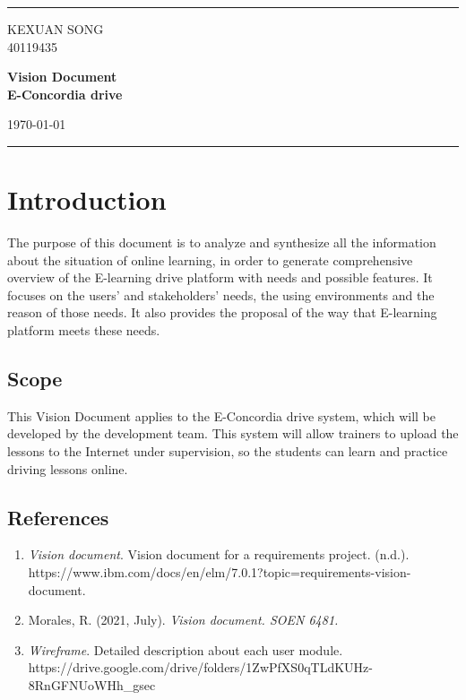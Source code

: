 \documentclass[a4paper]{article}
\begin{document}

\fancyhead[C]{}
\hrule\bigskip %
\begin{minipage}{0.295\textwidth} 
\raggedright
\normalsize
KEXUAN SONG \hfill\\   
40119435\hfill\\
\end{minipage}
\begin{minipage}{0.4\textwidth} 
\centering 
\Large
\textbf{Vision Document}\hfill\\
\textbf{E-Concordia drive}\hfill\\ 
\normalsize 
\end{minipage}
\begin{minipage}{0.295\textwidth} 
\raggedleft
\today\hfill\\
\end{minipage}
\medskip\hrule 
\bigskip


\section{Introduction}
The purpose of this document is to analyze and synthesize all the information about the situation of online learning, in order to generate comprehensive overview of the E-learning drive platform with needs and possible features.  It focuses on the users’ and stakeholders’ needs, the using environments and the reason of those needs. It also provides the proposal of the way that E-learning platform meets these needs.
\bigskip
\subsection{Scope}
This Vision Document applies to the E-Concordia drive system, which will be developed by the development team. This system will allow trainers to upload the lessons to the Internet under supervision, so the students can learn and practice driving lessons online.
\bigskip
\subsection{References}
\begin{enumerate}
\setcounter{enumi}{0}
\item \textit{Vision document}. Vision document for a requirements project. (n.d.).\\ https://www.ibm.com/docs/en/elm/7.0.1?topic=requirements-vision-document. \\
\item Morales, R. (2021, July). \textit{Vision document. SOEN 6481.} \\
\item \textit{Wireframe}. Detailed description about each user module.\\https://drive.google.com/drive/folders/1ZwPfXS0qTLdKUHz-8RnGFNUoWHh\_gsec
\end{enumerate}
\bigskip
\end{document}
